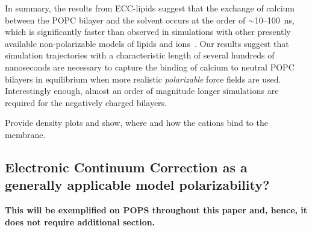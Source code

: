 \documentclass[journal=jpcbfk,manuscript=article]{achemso}
\begin{document}
In summary, the results from ECC-lipids suggest 
that the exchange of calcium between the POPC bilayer and the solvent 
occurs at the order of $\sim$10--100~ns, 
which is significantly faster than observed in simulations 
with other presently available non-polarizable models of lipids and ions~\citep{javanainen17, catte16}. 
Our results suggest 
that simulation trajectories with a characteristic length of several hundreds of nanoseconds 
are necessary to capture the binding of calcium to neutral POPC bilayers 
in equilibrium when more realistic \emph{polarizable} force fields are used. 
Interestingly enough, almost an order of magnitude longer simulations
are required for the negatively charged bilayers. 

 


Provide density plots and show, where and how the cations bind to the membrane. 



 
 

\subsection{Electronic Continuum Correction as a generally applicable model polarizability?}

\textbf{This will be exemplified on POPS throughout this paper and, hence, it does not require additional section. }
\end{document}
